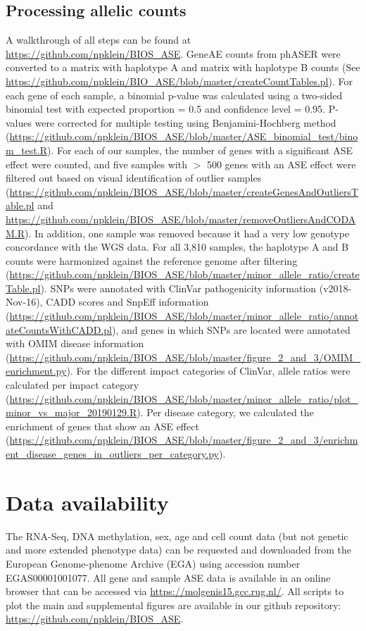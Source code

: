 {{\subsection{Processing allelic counts}
A walkthrough of all steps can be found at \url{https://github.com/npklein/BIOS\_ASE}. GeneAE counts from phASER\cite{castelRareVariantPhasing2016} were converted to a matrix with haplotype A and matrix with haplotype B counts (See \url{https://github.com/npklein/BIO\_ASE/blob/master/createCountTables.pl}). For each gene of each sample, a binomial p-value was calculated using a two-sided binomial test with expected proportion = 0.5 and confidence level = 0.95. P-values were corrected for multiple testing using Benjamini-Hochberg method\cite{benjaminiControllingFalseDiscovery1995} (\url{https://github.com/npklein/BIOS\_ASE/blob/master/ASE\_binomial\_test/binom\_test.R}). For each of our samples, the number of genes with a significant ASE effect were counted, and five samples with $>$ 500 genes with an ASE effect were filtered out based on visual identification of outlier samples (\url{https://github.com/npklein/BIOS\_ASE/blob/master/createGenesAndOutliersTable.pl} and \url{https://github.com/npklein/BIOS\_ASE/blob/master/removeOutliersAndCODAM.R}). In addition, one sample was removed because it had a very low genotype concordance with the WGS data. For all 3,810 samples, the haplotype A and B counts were harmonized against the reference genome after filtering (\url{https://github.com/npklein/BIOS\_ASE/blob/master/minor\_allele\_ratio/createTable.pl}). SNPs were annotated with ClinVar pathogenicity information (v2018-Nov-16), CADD scores\cite{kircherGeneralFrameworkEstimating2014} and SnpEff information (\url{https://github.com/npklein/BIOS\_ASE/blob/master/minor\_allele\_ratio/annotateCountsWithCADD.pl}), and genes in which SNPs are located were annotated with OMIM disease information (\url{https://github.com/npklein/BIOS\_ASE/blob/master/figure\_2\_and\_3/OMIM\_enrichment.py}). For the different impact categories of ClinVar, allele ratios were calculated per impact category (\url{https://github.com/npklein/BIOS\_ASE/blob/master/minor\_allele\_ratio/plot\_minor\_vs\_major\_20190129.R}). Per disease category, we calculated the enrichment of genes that show an ASE effect (\url{https://github.com/npklein/BIOS\_ASE/blob/master/figure\_2\_and\_3/enrichment\_disease\_genes\_in\_outliers\_per\_category.py}). 

\section*{Data availability}
The RNA-Seq, DNA methylation, sex, age and cell count data (but not genetic and more extended phenotype data) can be requested and downloaded from the European Genome-phenome Archive (EGA) using accession number EGAS00001001077. All gene and sample ASE data is available in an online browser that can be accessed via \url{https://molgenis15.gcc.rug.nl/}. All scripts to plot the main and supplemental figures are available in our github repository: \url{https://github.com/npklein/BIOS\_ASE}.

}}
